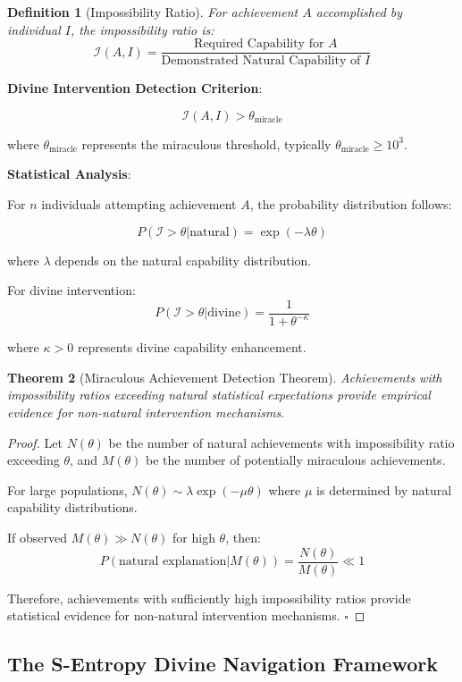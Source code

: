 \documentclass[12pt,a4paper]{article}
\newtheorem{theorem}{Theorem}[section]
\newtheorem{definition}[theorem]{Definition}
\begin{document}
\begin{definition}[Impossibility Ratio]
For achievement $A$ accomplished by individual $I$, the impossibility ratio is:
$$\mathcal{I}(A,I) = \frac{\text{Required Capability for } A}{\text{Demonstrated Natural Capability of } I}$$
\end{definition}

\textbf{Divine Intervention Detection Criterion}:

$$\mathcal{I}(A,I) > \theta_{\text{miracle}}$$

where $\theta_{\text{miracle}}$ represents the miraculous threshold, typically $\theta_{\text{miracle}} \geq 10^3$.

\textbf{Statistical Analysis}:

For $n$ individuals attempting achievement $A$, the probability distribution follows:

$$P(\mathcal{I} > \theta|\text{natural}) = \exp(-\lambda \theta)$$

where $\lambda$ depends on the natural capability distribution.

For divine intervention:
$$P(\mathcal{I} > \theta|\text{divine}) = \frac{1}{1 + \theta^{-\kappa}}$$

where $\kappa > 0$ represents divine capability enhancement.

\begin{theorem}[Miraculous Achievement Detection Theorem]
Achievements with impossibility ratios exceeding natural statistical expectations provide empirical evidence for non-natural intervention mechanisms.
\end{theorem}

\begin{proof}
Let $N(\theta)$ be the number of natural achievements with impossibility ratio exceeding $\theta$, and $M(\theta)$ be the number of potentially miraculous achievements.

For large populations, $N(\theta) \sim \lambda \exp(-\mu \theta)$ where $\mu$ is determined by natural capability distributions.

If observed $M(\theta) \gg N(\theta)$ for high $\theta$, then:
$$P(\text{natural explanation}|M(\theta)) = \frac{N(\theta)}{M(\theta)} \ll 1$$

Therefore, achievements with sufficiently high impossibility ratios provide statistical evidence for non-natural intervention mechanisms. $\square$
\end{proof}

\subsection{The S-Entropy Divine Navigation Framework}
\end{document}
